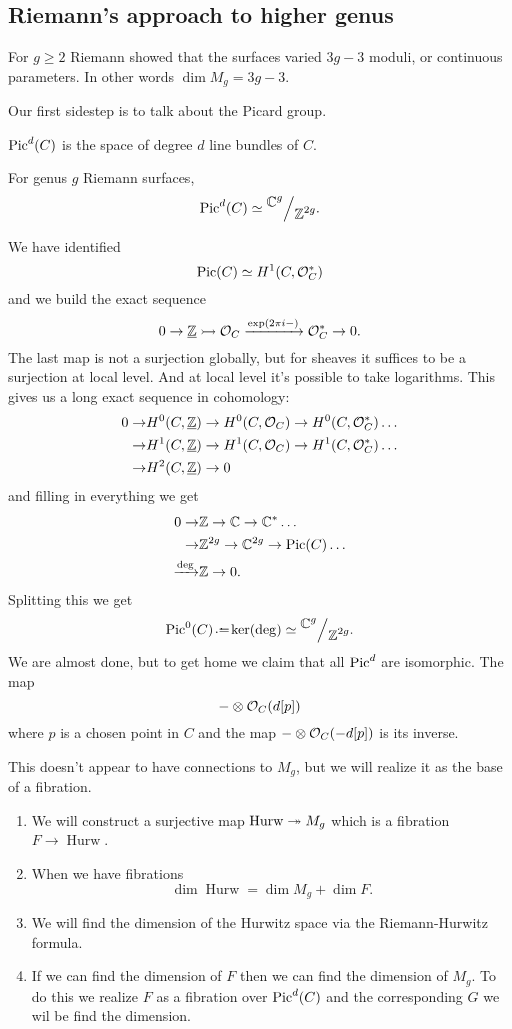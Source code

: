 \documentclass[12pt]{memoir}
\begin{document}
\subsection{Riemann's approach to higher genus}

For $g\geq 2$ Riemann showed that the surfaces varied $3g-3$ moduli, or continuous parameters. In other words $\dim M_g=3g-3$.\par
Our first sidestep is to talk about the Picard group.

\begin{Def}
    $\operatorname{Pic}^d(C)$ is the space of degree $d$ line bundles of $C$.
\end{Def}

For genus $g$ Riemann surfaces, 
$$\Pic^d(C)\isom\quot{\bC^g}{\bZ^{2g}}.$$

\begin{ptcbp}
    We have identified 
    $$\operatorname{Pic}(C)\simeq H^1(C,\mathcal{O}_C^\ast)$$
    and we build the exact sequence
    $$0\to\underline{\mathbb{Z}}\rightarrowtail\mathcal{O}_C\xrightarrow{\exp(2\pi i-)}\mathcal{O}_C^\ast\to 0.$$
    The last map is not a surjection globally, but for sheaves it suffices to be a surjection at local level. And at local level it's possible to take logarithms. This gives us a long exact sequence in cohomology:
    \begin{align*}
        0\to&H^0(C,\underline{\mathbb{Z}})\to H^0(C,\mathcal{O}_C)\to H^0(C,\mathcal{O}_C^\ast)\dots\\
        \to&H^1(C,\underline{\mathbb{Z}})\to H^1(C,\mathcal{O}_C)\to H^1(C,\mathcal{O}_C^\ast)\dots\\
        \to&H^2(C,\underline{\mathbb{Z}})\to 0
    \end{align*}
    and filling in everything we get 
    \begin{align*}
        0\to&\mathbb{Z}\to \mathbb{C}\to \mathbb{C}^\ast\dots\\
        \to&\mathbb{Z}^{2g}\to \mathbb{C}^{2g}\to \operatorname{Pic}(C)\dots\\
        \xrightarrow{\deg}&\mathbb{Z}\to 0.
    \end{align*}
Splitting this we get 
$$\Pic^0(C)\defeq\ker(\deg)\isom\quot{\bC^g}{\bZ^{2g}}.$$
We are almost done, but to get home we claim that all $\operatorname{Pic}^d$ are isomorphic. The map 
$$-\otimes\mathcal{O}_C(d[p])$$
where $p$ is a chosen point in $C$ and the map $-\otimes\mathcal{O}_C(-d[p])$ is its inverse.
\end{ptcbp}

This doesn't appear to have connections to $M_g$, but we will realize it as the base of a fibration. 
\begin{enumerate}
    \item We will construct a surjective map $\operatorname{Hurw}\twoheadrightarrow M_g$ which is a fibration $F\to\operatorname{Hurw}$.
    \item When we have fibrations 
    $$\dim\operatorname{Hurw}=\dim M_g+\dim F.$$
    \item We will find the dimension of the Hurwitz space via the Riemann-Hurwitz formula.
    \item If we can find the dimension of $F$ then we can find the dimension of $M_g$. To do this we realize $F$ as a fibration over $\operatorname{Pic}^d(C)$ and the corresponding $G$ we wil be find the dimension. 
\end{enumerate}
\end{document}
